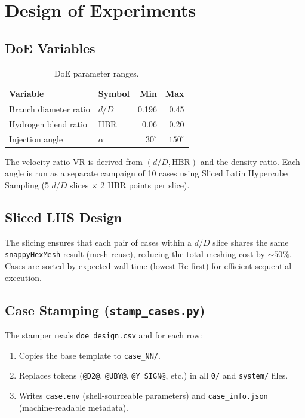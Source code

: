 \documentclass[12pt,a4paper]{report}
\begin{document}
\chapter{Design of Experiments}
\label{ch:doe}

\section{DoE Variables}

\begin{table}[H]
\centering
\caption{DoE parameter ranges.}
\begin{tabular}{@{}llrr@{}}
\toprule
\textbf{Variable} & \textbf{Symbol} & \textbf{Min} & \textbf{Max} \\
\midrule
Branch diameter ratio & $d/D$ & 0.196 & 0.45 \\
Hydrogen blend ratio  & HBR   & 0.06  & 0.20 \\
Injection angle       & $\alpha$ & $30^{\circ}$ & $150^{\circ}$ \\
\bottomrule
\end{tabular}
\end{table}

\noindent The velocity ratio VR is derived from $(d/D, \mathrm{HBR})$
and the density ratio.  Each angle is run as a separate campaign of
10 cases using Sliced Latin Hypercube Sampling (5 $d/D$ slices
$\times$ 2 HBR points per slice).

\section{Sliced LHS Design}

The slicing ensures that each pair of cases within a $d/D$ slice
shares the same \texttt{snappyHexMesh} result (mesh reuse), reducing
the total meshing cost by $\sim 50\%$.  Cases are sorted by expected
wall time (lowest Re first) for efficient sequential execution.

\section{Case Stamping (\texttt{stamp\_cases.py})}

The stamper reads \texttt{doe\_design.csv} and for each row:
\begin{enumerate}
  \item Copies the base template to \texttt{case\_NN/}.
  \item Replaces tokens (\texttt{@D2@}, \texttt{@UBY@},
        \texttt{@Y\_SIGN@}, etc.) in all \texttt{0/} and
        \texttt{system/} files.
  \item Writes \texttt{case.env} (shell-sourceable parameters) and
        \texttt{case\_info.json} (machine-readable metadata).
\end{enumerate}
\end{document}
